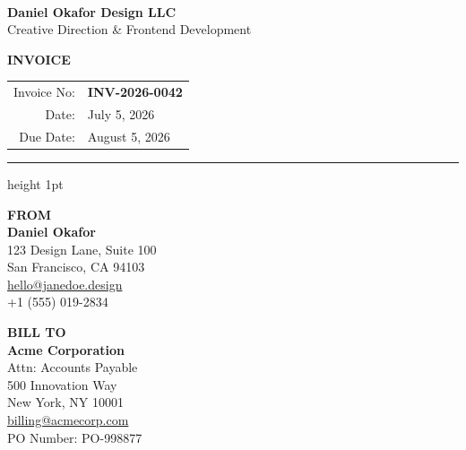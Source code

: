 \documentclass[10pt,letterpaper]{article}
\renewcommand{\arraystretch}{1.3} %
\begin{document}
\begin{minipage}[t]{0.5\textwidth}
    \vspace{0pt} %
     \\[3mm]
    {\sffamily\bfseries\large Daniel Okafor Design LLC} \\
    {\color{mutedneutral}\small Creative Direction \& Frontend Development}
\end{minipage}%
\begin{minipage}[t]{0.5\textwidth}
    \vspace{0pt} %
    \raggedleft
    {\color{accent}\Huge\bfseries INVOICE} \\[3mm]
    \renewcommand{\arraystretch}{1.1}
    \begin{tabular}{@{}r l@{}}
        {\color{mutedneutral}\small Invoice No:} & \textbf{\color{darkneutral}\small INV-2026-0042} \\
        {\color{mutedneutral}\small Date:}       & {\color{darkneutral}\small July 5, 2026} \\
        {\color{mutedneutral}\small Due Date:}   & {\color{darkneutral}\small August 5, 2026}
    \end{tabular}
\end{minipage}

\vspace{6mm}
{\color{lightneutral}\hrule height 1pt}
\vspace{6mm}

\begin{minipage}[t]{0.5\textwidth}
    \vspace{0pt}
    {\color{accent}\bfseries\small FROM} \\[2mm]
    {\bfseries\color{darkneutral} Daniel Okafor} \\
    {\color{mutedneutral}\small
    123 Design Lane, Suite 100 \\
    San Francisco, CA 94103 \\
    \href{mailto:hello@janedoe.design}{hello@janedoe.design} \\
    +1 (555) 019-2834
    }
\end{minipage}%
\begin{minipage}[t]{0.5\textwidth}
    \vspace{0pt}
    {\color{accent}\bfseries\small BILL TO} \\[2mm]
    {\bfseries\color{darkneutral} Acme Corporation} \\
    {\color{mutedneutral}\small
    Attn: Accounts Payable \\
    500 Innovation Way \\
    New York, NY 10001 \\
    \href{mailto:billing@acmecorp.com}{billing@acmecorp.com} \\
    PO Number: PO-998877
    }
\end{minipage}
\end{document}
